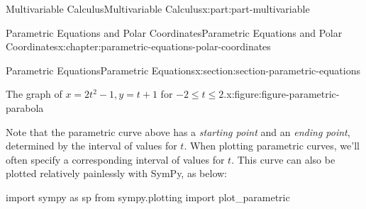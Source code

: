 \documentclass[twoside,10pt,]{tufte-book}
\numberwithin{equation}{part}
\begin{document}
\begin{partptx}{Multivariable Calculus}{}{Multivariable Calculus}{}{}{x:part:part-multivariable}
\begin{chapterptx}{Parametric Equations and Polar Coordinates}{}{Parametric Equations and Polar Coordinates}{}{}{x:chapter:parametric-equations-polar-coordinates}
\begin{sectionptx}{Parametric Equations}{}{Parametric Equations}{}{}{x:section:section-parametric-equations}
\begin{figureptx}{The graph of \(x = 2t^2-1, y=t+1\) for \(-2\leq t\leq 2\).}{x:figure:figure-parametric-parabola}{}
\begin{image}{0}{1}{0}
{
}%
\end{image}%
\tcblower
\end{figureptx}%
Note that the parametric curve above has a \emph{starting point} and an \emph{ending point}, determined by the interval of values for \(t\). When plotting parametric curves, we'll often specify a corresponding interval of values for \(t\). This curve can also be plotted relatively painlessly with SymPy, as below:%
\begin{sageinput}
import sympy as sp
from sympy.plotting import plot_parametric


\end{sageinput}
\end{sectionptx}
\end{chapterptx}
\end{partptx}
\end{document}
